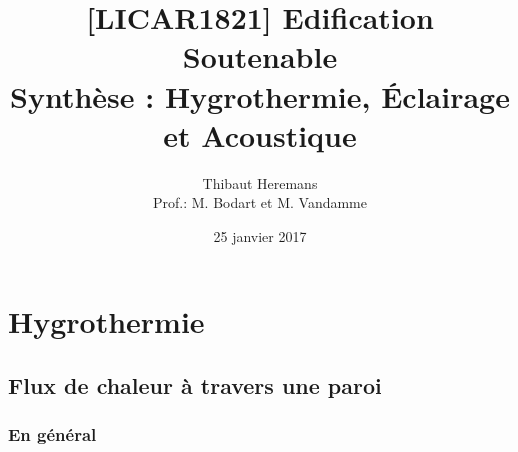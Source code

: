 \documentclass[11pt]{report}
\title{[LICAR1821] Edification Soutenable\\ Synthèse : Hygrothermie, Éclairage et Acoustique}
\date {25 janvier 2017}
\author{Thibaut Heremans\\ Prof.: M. Bodart et M. Vandamme}
\begin{document}
\maketitle
\tableofcontents





\part{Hygrothermie}
\chapter{Flux de chaleur à travers une paroi}
\section{En général}
\end{document}
